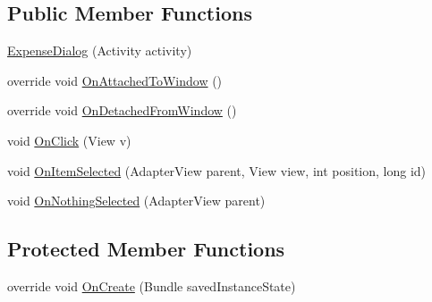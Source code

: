 \subsection*{Public Member Functions}
\begin{DoxyCompactItemize}
\item 
\hyperlink{class_field_service_1_1_android_1_1_dialogs_1_1_expense_dialog_aac2145dc270d3a551b3c912eac4cef3f}{Expense\+Dialog} (Activity activity)
\item 
override void \hyperlink{class_field_service_1_1_android_1_1_dialogs_1_1_expense_dialog_a464e6a37071ce245a25022632ee71029}{On\+Attached\+To\+Window} ()
\item 
override void \hyperlink{class_field_service_1_1_android_1_1_dialogs_1_1_expense_dialog_af98a8a3121f95760ded5418ebf5dc3f0}{On\+Detached\+From\+Window} ()
\item 
void \hyperlink{class_field_service_1_1_android_1_1_dialogs_1_1_expense_dialog_a63804c18162f9060fb63b9444d83130e}{On\+Click} (View v)
\item 
void \hyperlink{class_field_service_1_1_android_1_1_dialogs_1_1_expense_dialog_a8c2f02d9a4031fc53e8b9b979f8fb184}{On\+Item\+Selected} (Adapter\+View parent, View view, int position, long id)
\item 
void \hyperlink{class_field_service_1_1_android_1_1_dialogs_1_1_expense_dialog_a656532b256e4f39868667c98e502b2b2}{On\+Nothing\+Selected} (Adapter\+View parent)
\end{DoxyCompactItemize}
\subsection*{Protected Member Functions}
\begin{DoxyCompactItemize}
\item 
override void \hyperlink{class_field_service_1_1_android_1_1_dialogs_1_1_expense_dialog_a29be985a144e627eec5ae8efe575e624}{On\+Create} (Bundle saved\+Instance\+State)
\end{DoxyCompactItemize}
